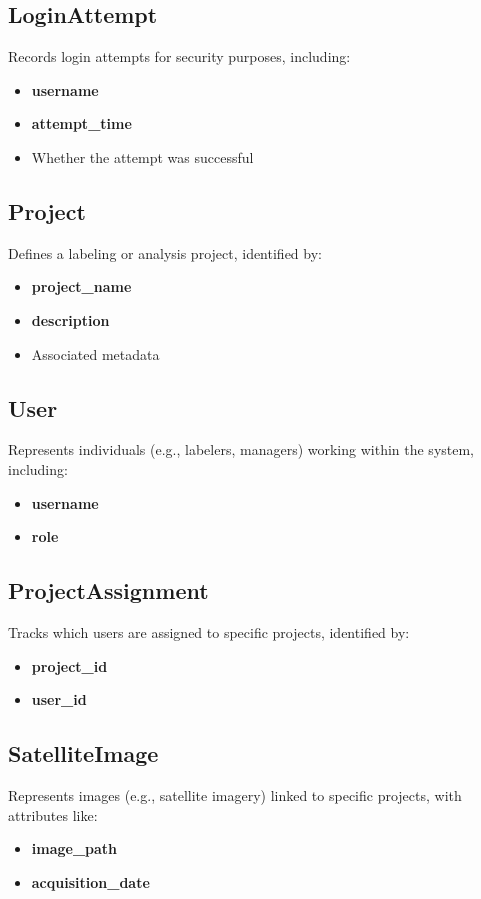 \documentclass[12pt, titlepage]{article}
\begin{document}
\subsection*{LoginAttempt}
Records login attempts for security purposes, including:
\begin{itemize}
    \item \textbf{username}
    \item \textbf{attempt\_time}
    \item Whether the attempt was successful
\end{itemize}

\subsection*{Project}
Defines a labeling or analysis project, identified by:
\begin{itemize}
    \item \textbf{project\_name}
    \item \textbf{description}
    \item Associated metadata
\end{itemize}

\subsection*{User}
Represents individuals (e.g., labelers, managers) working within the system, including:
\begin{itemize}
    \item \textbf{username}
    \item \textbf{role}
\end{itemize}

\subsection*{ProjectAssignment}
Tracks which users are assigned to specific projects, identified by:
\begin{itemize}
    \item \textbf{project\_id}
    \item \textbf{user\_id}
\end{itemize}

\subsection*{SatelliteImage}
Represents images (e.g., satellite imagery) linked to specific projects, with attributes like:
\begin{itemize}
    \item \textbf{image\_path}
    \item \textbf{acquisition\_date}
\end{itemize}
\end{document}
